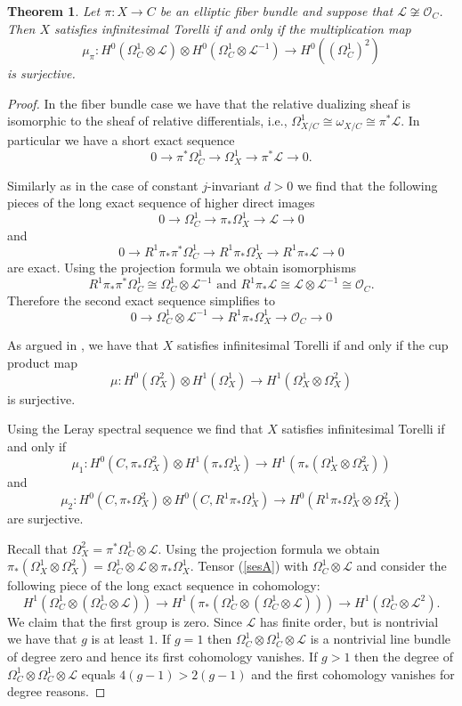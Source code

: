 \documentclass{amsart}
\newcommand{\cL}{\mathcal{L}}
\newcommand{\cO}{\mathcal{O}}
\newtheorem{theorem}{Theorem}[section]
\theoremstyle{definition}
\theoremstyle{remark}
\begin{document}
\begin{theorem} Let $\pi: X \to C$ be an elliptic fiber bundle and suppose  that $\cL\not \cong \cO_C$. Then $X$ satisfies infinitesimal Torelli if and only if  the multiplication map
\[ \mu_\pi: H^0(\Omega^1_C\otimes \cL) \otimes  H^0(\Omega^1_C\otimes \cL ^{-1}) \to H^0((\Omega^1_C)^2)\]
is surjective. 
\end{theorem}
\begin{proof}
In the fiber bundle case we have that the relative dualizing sheaf is isomorphic to the sheaf of relative differentials, i.e., $\Omega^1_{X/C}\cong \omega_{X/C}\cong \pi^*\cL$. 
In particular we have a short exact sequence
\[ 0 \to \pi^* \Omega^1_C\to \Omega^1_X\to  \pi^*\cL \to 0.\]

Similarly as in the case of constant $j$-invariant $d>0$ we find that the following pieces of the long exact sequence of higher direct images
\begin{equation}\label{sesA} 0 \to \Omega^1_C\to \pi_* \Omega^1_X\to \cL\to 0\end{equation}
and
\[ 0 \to R^1\pi_*\pi^*\Omega^1_C\to R^1\pi_*\Omega^1_X \to R^1\pi_* \cL \to 0\]
are exact. 
Using the projection formula we obtain isomorphisms
\[ R^1\pi_*\pi^* \Omega^1_C\cong \Omega^1_C\otimes \cL^{-1}
\mbox{ and } R^1\pi_* \cL\cong \cL\otimes \cL^{-1}\cong \cO_C.\]
Therefore the second exact sequence simplifies to 
\begin{equation}\label{sesB} 0 \to \Omega^1_C \otimes \cL^{-1} \to R^1\pi_*\Omega^1_X \to \cO_C \to 0\end{equation}

As argued in \cite{Sai}, we have that $X$ satisfies infinitesimal Torelli if and only if the cup product map
\[ \mu: H^0(\Omega^2_X)\otimes H^1(\Omega^1_X)\to H^1(\Omega^1_X\otimes \Omega^2_X)\]
is surjective.

Using the Leray spectral sequence we find that $X$ satisfies infinitesimal Torelli if and only if
\[ \mu_1:H^0(C,\pi_*\Omega^2_X)\otimes H^1(\pi_*\Omega^1_X)\to H^1(\pi_*(\Omega^1_X\otimes \Omega^2_X))\]
and
\[ \mu_2:H^0(C,\pi_*\Omega^2_X)\otimes H^0(C,R^1\pi_*\Omega^1_X)\to H^0(R^1\pi_*\Omega^1_X\otimes \Omega^2_X)\]
are surjective.

Recall that $\Omega^2_X=\pi^* \Omega^1_C\otimes \cL$. Using the projection formula we obtain $\pi_*(\Omega^1_X\otimes \Omega^2_X)=\Omega^1_C \otimes \cL \otimes \pi_*\Omega^1_X$.
Tensor (\ref{sesA}) with $\Omega^1_C\otimes \cL$ and consider the following piece of the long exact sequence in cohomology:
\[ H^1(\Omega^1_C \otimes (\Omega^1_C \otimes \cL))\to H^1( \pi_*(\Omega^1_C\otimes (\Omega^1_C \otimes \cL)))\to H^1(\Omega^1_C\otimes \cL^2).\]
We claim that the first group is zero. Since $\cL$ has finite order, but is nontrivial we have that $g$ is at least $1$. If $g=1$ then $\Omega^1_C \otimes \Omega^1_C \otimes \cL$ is a nontrivial line bundle of degree zero and hence its first cohomology vanishes. If $g>1$ then the degree of $\Omega^1_C \otimes \Omega^1_C \otimes \cL$ equals $4(g-1)>2(g-1)$ and the first cohomology vanishes for degree reasons.


\end{proof}
\end{document}
